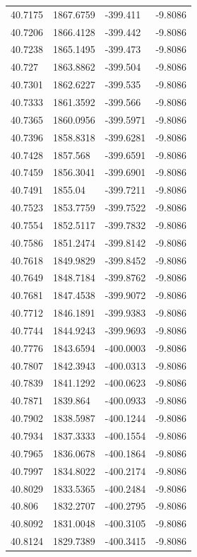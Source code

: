 \begin{table}[H]
\begin{tabular}{llll}
40.7175 & 1867.6759 & -399.411 & -9.8086 \\
40.7206 & 1866.4128 & -399.442 & -9.8086 \\
40.7238 & 1865.1495 & -399.473 & -9.8086 \\
40.727 & 1863.8862 & -399.504 & -9.8086 \\
40.7301 & 1862.6227 & -399.535 & -9.8086 \\
40.7333 & 1861.3592 & -399.566 & -9.8086 \\
40.7365 & 1860.0956 & -399.5971 & -9.8086 \\
40.7396 & 1858.8318 & -399.6281 & -9.8086 \\
40.7428 & 1857.568 & -399.6591 & -9.8086 \\
40.7459 & 1856.3041 & -399.6901 & -9.8086 \\
40.7491 & 1855.04 & -399.7211 & -9.8086 \\
40.7523 & 1853.7759 & -399.7522 & -9.8086 \\
40.7554 & 1852.5117 & -399.7832 & -9.8086 \\
40.7586 & 1851.2474 & -399.8142 & -9.8086 \\
40.7618 & 1849.9829 & -399.8452 & -9.8086 \\
40.7649 & 1848.7184 & -399.8762 & -9.8086 \\
40.7681 & 1847.4538 & -399.9072 & -9.8086 \\
40.7712 & 1846.1891 & -399.9383 & -9.8086 \\
40.7744 & 1844.9243 & -399.9693 & -9.8086 \\
40.7776 & 1843.6594 & -400.0003 & -9.8086 \\
40.7807 & 1842.3943 & -400.0313 & -9.8086 \\
40.7839 & 1841.1292 & -400.0623 & -9.8086 \\
40.7871 & 1839.864 & -400.0933 & -9.8086 \\
40.7902 & 1838.5987 & -400.1244 & -9.8086 \\
40.7934 & 1837.3333 & -400.1554 & -9.8086 \\
40.7965 & 1836.0678 & -400.1864 & -9.8086 \\
40.7997 & 1834.8022 & -400.2174 & -9.8086 \\
40.8029 & 1833.5365 & -400.2484 & -9.8086 \\
40.806 & 1832.2707 & -400.2795 & -9.8086 \\
40.8092 & 1831.0048 & -400.3105 & -9.8086 \\
40.8124 & 1829.7389 & -400.3415 & -9.8086 \\

\end{tabular}
\end{table}
